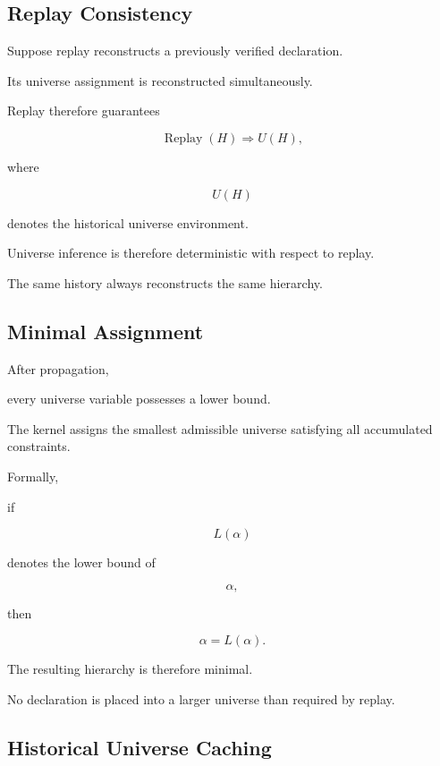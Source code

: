 \documentclass[12pt,oneside]{article}
\theoremstyle{definition}
\theoremstyle{remark}
\DeclareMathOperator{\Replay}{Replay}
\begin{document}

\subsection{Replay Consistency}

Suppose replay reconstructs a previously verified declaration.

Its universe assignment is reconstructed simultaneously.

Replay therefore guarantees

\[
\Replay(H)
\Longrightarrow
U(H),
\]

where

\[
U(H)
\]

denotes the historical universe environment.

Universe inference is therefore deterministic with respect to replay.

The same history always reconstructs the same hierarchy.


\subsection{Minimal Assignment}

After propagation,

every universe variable possesses a lower bound.

The kernel assigns the smallest admissible universe satisfying all accumulated
constraints.

Formally,

if

\[
L(\alpha)
\]

denotes the lower bound of

\[
\alpha,
\]

then

\[
\alpha
=
L(\alpha).
\]

The resulting hierarchy is therefore minimal.

No declaration is placed into a larger universe than required by replay.


\subsection{Historical Universe Caching}
\end{document}
